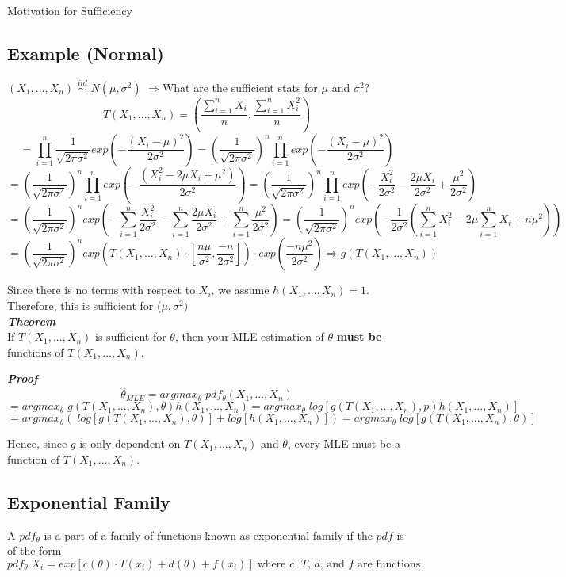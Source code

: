 \documentclass[12pt]{article}
\begin{document}
\begin{section}{Motivation for Sufficiency}
\subsection{Example (Normal)} 
$(X_1,...,X_n)$ $\stackrel{iid}{\sim}$ $N(\mu,\sigma^2)$
$\Rightarrow$What are the sufficient stats for $\mu$ and $\sigma^2$?\\
$$T(X_1,...,X_n) = (\frac{\sum_{i=1}^n X_i}{n}, \frac{\sum_{i=1}^n X_i^2}{n})$$
$$= \prod_{i=1}^n \frac{1}{\sqrt{2\pi\sigma^2}}exp(-\frac{(X_i-\mu)^2}{2\sigma^2}) = (\frac{1}{\sqrt{2\pi\sigma^2}})^n \prod_{i=1}^n exp(-\frac{(X_i-\mu)^2}{2\sigma^2})$$
$$=(\frac{1}{\sqrt{2\pi\sigma^2}})^n \prod_{i=1}^n exp(-\frac{(X_i^2-2\mu X_i+\mu^2)}{2\sigma^2}) = (\frac{1}{\sqrt{2\pi\sigma^2}})^n \prod_{i=1}^n exp(-\frac{X_i^2}{2\sigma^2}-\frac{2\mu X_i}{2\sigma^2} + \frac{\mu^2}{2\sigma^2})$$
$$=(\frac{1}{\sqrt{2\pi\sigma^2}})^n exp(-\sum_{i=1}^n \frac{X_i^2}{2\sigma^2}-\sum_{i=1}^n \frac{2\mu X_i}{2\sigma^2} + \sum_{i=1}^n \frac{\mu^2}{2\sigma^2}) = (\frac{1}{\sqrt{2\pi\sigma^2}})^n exp(-\frac{1}{2\sigma^2}(\sum_{i=1}^n X_i^2-2\mu\sum_{i=1}^n  X_i + n\mu^2))$$
$$=(\frac{1}{\sqrt{2\pi\sigma^2}})^n exp(T(X_1,...,X_n) \cdot [\frac{n\mu}{\sigma^2}, \frac{-n}{2\sigma^2}]) \cdot exp(\frac{-n\mu^2}{2\sigma^2}) \Rightarrow g(T(X_1,...,X_n))$$

Since there is no terms with respect to $X_i$, we assume $h(X_1,...,X_n) =1$.
Therefore, this is sufficient for ($\mu,\sigma^2)$\\


\textbf{\emph{Theorem}}\\
If $T(X_1,...,X_n)$ is sufficient for $\theta$, then your MLE estimation of $\theta$ \textbf{must be} functions of $T(X_1,...,X_n)$.

\textbf{\emph{Proof}} 
$$\hat{\theta}_{MLE} = argmax_{\theta} \; pdf_{\theta}(X_1,...,X_n) $$
$$= argmax_{\theta} \;g(T(X_1,...,X_n), \theta) h(X_1,...,X_n)=argmax_{\theta} \; log[g(T(X_1,...,X_n), p) h(X_1,...,X_n)]$$ $$=argmax_{\theta} (\; log[g(T(X_1,...,X_n), \theta)] + log [h(X_1,...,X_n)]) = argmax_{\theta} \; log[g(T(X_1,...,X_n), \theta)]$$

Hence, since $g$ is only dependent on $T(X_1,...,X_n)$ and $\theta$, every MLE must be a function of $T(X_1,...,X_n)$.

\section{Exponential Family}
A $pdf_\theta$ is a part of a family of functions known as exponential family if the $pdf$ is of the form
$$pdf_\theta \;X_i = exp[c(\theta)\cdot T(x_i)+ d(\theta) + f(x_i)] \; \text{where $c$, $T$, $d$, and $f$ are functions}$$


\end{section}
\end{document}
